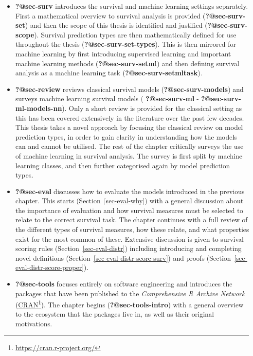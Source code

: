 \documentclass[
  letterpaper,
]{scrbook}
\theoremstyle{plain}
\theoremstyle{definition}
\theoremstyle{remark}
\begin{document}
\begin{itemize}
\item
  \textbf{?@sec-surv} introduces the survival and machine learning
  settings separately. First a mathematical overview to survival
  analysis is provided (\textbf{?@sec-surv-set}) and then the scope of
  this thesis is identified and justified (\textbf{?@sec-surv-scope}).
  Survival prediction types are then mathematically defined for use
  throughout the thesis (\textbf{?@sec-surv-set-types}). This is then
  mirrored for machine learning by first introducing supervised learning
  and important machine learning methods (\textbf{?@sec-surv-setml}) and
  then defining survival analysis as a machine learning task
  (\textbf{?@sec-surv-setmltask}).
\item
  \textbf{?@sec-review} reviews classical survival models
  (\textbf{?@sec-surv-models}) and surveys machine learning survival
  models ( \textbf{?@sec-surv-ml} - \textbf{?@sec-surv-ml-models-nn}).
  Only a short review is provided for the classical setting as this has
  been covered extensively in the literature over the past few decades.
  This thesis takes a novel approach by focusing the classical review on
  model prediction types, in order to gain clarity in understanding how
  the models can and cannot be utilised. The rest of the chapter
  critically surveys the use of machine learning in survival analysis.
  The survey is first split by machine learning classes, and then
  further categorised again by model prediction types.
\item
  \textbf{?@sec-eval} discusses how to evaluate the models introduced in
  the previous chapter. This starts (Section~\ref{sec-eval-why}) with a
  general discussion about the importance of evaluation and how survival
  measures must be selected to relate to the correct survival task. The
  chapter continues with a full review of the different types of
  survival measures, how these relate, and what properties exist for the
  most common of these. Extensive discussion is given to survival
  scoring rules (Section~\ref{sec-eval-distr}) including introducing and
  completing novel definitions (Section~\ref{sec-eval-distr-score-surv})
  and proofs (Section~\ref{sec-eval-distr-score-proper}).
\item
  \textbf{?@sec-tools} focuses entirely on software engineering and
  introduces the packages that have been published to the
  \emph{Comprehensive R Archive Network}
  (\href{https://cran.r-project.org/}{CRAN}\footnote{\url{https://cran.r-project.org/}}).
  The chapter begins (\textbf{?@sec-tools-intro}) with a general
  overview to the ecosystem that the packages live in, as well as their
  original motivations.
\end{itemize}
\end{document}
